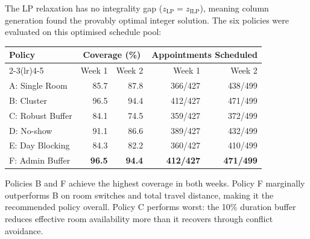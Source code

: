 \documentclass[12pt]{article}
\begin{document}
\noindent The LP relaxation has no integrality gap ($z_{\mathrm{LP}} = z_{\mathrm{ILP}}$),
meaning column generation found the provably optimal integer solution. The six policies
were evaluated on this optimised schedule pool:

\begin{center}
\begin{tabular}{lrrrr}
\toprule
\textbf{Policy} & \multicolumn{2}{c}{\textbf{Coverage (\%)}} & \multicolumn{2}{c}{\textbf{Appointments Scheduled}} \\
\cmidrule(lr){2-3}\cmidrule(lr){4-5}
 & Week 1 & Week 2 & Week 1 & Week 2 \\
\midrule
A: Single Room   & 85.7 & 87.8 & 366/427 & 438/499 \\
B: Cluster       & 96.5 & 94.4 & 412/427 & 471/499 \\
C: Robust Buffer & 84.1 & 74.5 & 359/427 & 372/499 \\
D: No-show       & 91.1 & 86.6 & 389/427 & 432/499 \\
E: Day Blocking  & 84.3 & 82.2 & 360/427 & 410/499 \\
F: Admin Buffer  & \textbf{96.5} & \textbf{94.4} & \textbf{412/427} & \textbf{471/499} \\
\bottomrule
\end{tabular}
\end{center}

\noindent Policies B and F achieve the highest coverage in both weeks. Policy F
marginally outperforms B on room switches and total travel distance, making it the
recommended policy overall. Policy C performs worst: the 10\% duration buffer reduces
effective room availability more than it recovers through conflict avoidance.
\end{document}

